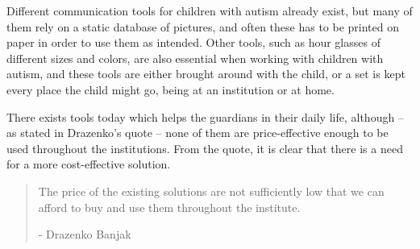 Different communication tools for children with autism already exist, but many of them rely on a static database of pictures, and often these has to be printed on paper in order to use them as intended. Other tools, such as hour glasses of different sizes and colors, are also essential when working with children with autism, and these tools are either brought around with the child, or a set is kept every place the child might go, being at an institution or at home.

There exists tools today which helps the guardians in their daily life, although -- as stated in Drazenko's quote -- none of them are price-effective enough to be used throughout the institutions. From the quote, it is clear that there is a need for a more cost-effective solution.

\begin{quotation}
The price of the existing solutions are not sufficiently low that we can afford to buy and use them throughout the institute.\\ 
	\begin{flushright}
		- Drazenko Banjak
	\end{flushright}
\end{quotation}